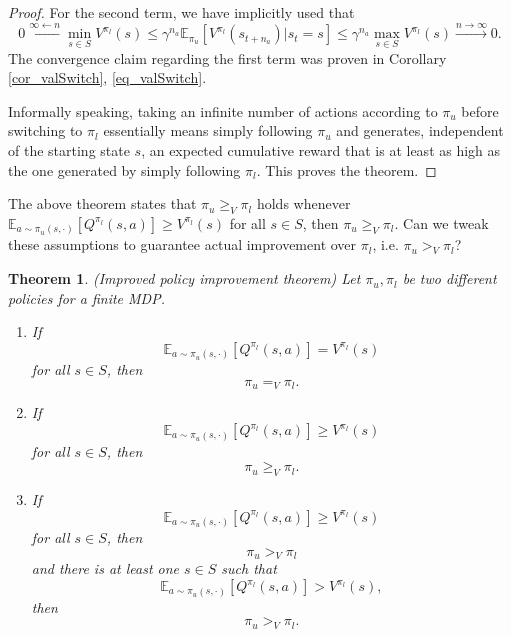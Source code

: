\documentclass[11pt]{article} %
\newtheorem{thm}{Theorem}
\begin{document}
\begin{proof}
	For the second term, we have implicitly used that $$0 \overset{\infty \leftarrow n}{\leftarrow} \min_{s \in S} V^{\pi_l}(s) \le \gamma^{n_a}\mathbb{E}_{\pi_u}[V^{\pi_l}(s_{t+n_a}) | s_t = s] \le \gamma^{n_a} \max_{s \in S} V^{\pi_l}(s) \overset{n \rightarrow \infty}{\rightarrow} 0.$$ The convergence claim regarding the first term was proven in Corollary \ref{cor_valSwitch}, \ref{eq_valSwitch}.

Informally speaking, taking an infinite number of actions according to $\pi_u$ before switching to $\pi_l$ essentially means simply following $\pi_u$ and generates, independent of the starting state $s$, an expected cumulative reward that is at least as high as the one generated by simply following $\pi_l$. This proves the theorem.

\end{proof}

The above theorem states that $\pi_u \ge_V \pi_l$ holds whenever $ \mathbb{E}_{a \sim \pi_u(s,\cdot )}[Q^{\pi_l}(s,a)] \ge V^{\pi_l}(s)$ for all $s \in S$, then $\pi_u \ge_V \pi_l.$ Can we tweak these assumptions to guarantee actual improvement over $\pi_l$, i.e. $\pi_u >_V \pi_l$?

\begin{thm}{(Improved policy improvement theorem)}
	Let $\pi_u, \pi_l$ be two different policies for a finite MDP.
	\begin{enumerate}
		\item If $$ \mathbb{E}_{a \sim \pi_u(s,\cdot )}[Q^{\pi_l}(s,a)] = V^{\pi_l}(s)$$ for all $s \in S$, then $$\pi_u =_V \pi_l.$$
		\item If $$ \mathbb{E}_{a \sim \pi_u(s,\cdot )}[Q^{\pi_l}(s,a)] \ge V^{\pi_l}(s)$$ for all $s \in S$, then $$\pi_u \ge_V \pi_l.$$
		\item If $$ \mathbb{E}_{a \sim \pi_u(s,\cdot )}[Q^{\pi_l}(s,a)] \ge V^{\pi_l}(s)$$ for all $s \in S$, then $$\pi_u >_V \pi_l$$ and there is at least one $s \in S$ such that $$ \mathbb{E}_{a \sim \pi_u(s,\cdot )}[Q^{\pi_l}(s,a)] > V^{\pi_l}(s),$$ then $$\pi_u >_V \pi_l.$$
	\end{enumerate}
\end{thm}
\end{document}
